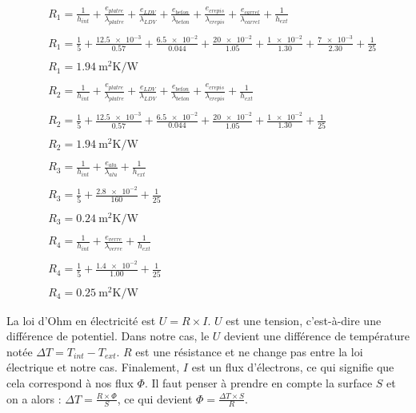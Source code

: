 \documentclass[12pt, a4paper]{article}
\newcommand{\TInt}{\ensuremath{T_{int}}}
\newcommand{\TExt}{\ensuremath{T_{ext}}}
\newcommand{\hInt}{\ensuremath{h_{int}}}
\newcommand{\hExt}{\ensuremath{h_{ext}}}
\newcommand{\RUn}{\ensuremath{R_{1}}}
\newcommand{\RDeux}{\ensuremath{R_{2}}}
\newcommand{\RTrois}{\ensuremath{R_{3}}}
\newcommand{\RQuatre}{\ensuremath{R_{4}}}
\newcommand{\lambdaAlu}{\ensuremath{\lambda_{alu}}}
\newcommand{\lambdaVerre}{\ensuremath{\lambda_{verre}}}
\newcommand{\lambdaPlatre}{\ensuremath{\lambda_{platre}}}
\newcommand{\lambdaLDV}{\ensuremath{\lambda_{LDV}}}
\newcommand{\lambdaBeton}{\ensuremath{\lambda_{beton}}}
\newcommand{\lambdaCrepis}{\ensuremath{\lambda_{crepis}}}
\newcommand{\lambdaCarrel}{\ensuremath{\lambda_{carrel}}}
\newcommand{\ePlatre}{\ensuremath{e_{platre}}}
\newcommand{\eLDV}{\ensuremath{e_{LDV}}}
\newcommand{\eBeton}{\ensuremath{e_{beton}}}
\newcommand{\eCrepis}{\ensuremath{e_{crepis}}}
\newcommand{\eCarrel}{\ensuremath{e_{carrel}}}
\newcommand{\eAlu}{\ensuremath{e_{alu}}}
\newcommand{\eVerre}{\ensuremath{e_{verre}}}
\newcommand{\deltaT}{\ensuremath{\Delta T}}
\begin{document}
\begin{align*}
 & \RUn  = \frac{1}{\hInt} + \frac{\ePlatre}{\lambdaPlatre} + \frac{\eLDV}{\lambdaLDV} + \frac{\eBeton}{\lambdaBeton} + \frac{\eCrepis}{\lambdaCrepis} + \frac{\eCarrel}{\lambdaCarrel} + \frac{1}{\hExt} \\ \\
 & \RUn = \frac{1}{5} + \frac{\num{12.5e-3}}{0.57} + \frac{\num{6.5e-2}}{0.044} + \frac{\num{20e-2}}{1.05} + \frac{\num{1e-2}}{1.30} + \frac{\num{7e-3}}{2.30} + \frac{1}{25} \\ \\
 & \boxed{\RUn = \SI{1.94}{\meter\squared\kelvin\per\watt}} \\ \\
 & \RDeux  = \frac{1}{\hInt} + \frac{\ePlatre}{\lambdaPlatre} + \frac{\eLDV}{\lambdaLDV} + \frac{\eBeton}{\lambdaBeton} + \frac{\eCrepis}{\lambdaCrepis} + \frac{1}{\hExt} \\ \\
 & \RDeux = \frac{1}{5} + \frac{\num{12.5e-3}}{0.57} + \frac{\num{6.5e-2}}{0.044} + \frac{\num{20e-2}}{1.05} + \frac{\num{1e-2}}{1.30} + \frac{1}{25} \\ \\
 & \boxed{\RDeux = \SI{1.94}{\meter\squared\kelvin\per\watt}} \\ \\
 & \RTrois  = \frac{1}{\hInt} + \frac{\eAlu}{\lambdaAlu} + \frac{1}{\hExt} \\ \\
 & \RTrois = \frac{1}{5} + \frac{\num{2.8e-2}}{160} + \frac{1}{25} \\ \\
 & \boxed{\RTrois = \SI{0.24}{\meter\squared\kelvin\per\watt}} \\ \\
 & \RQuatre  = \frac{1}{\hInt} + \frac{\eVerre}{\lambdaVerre} + \frac{1}{\hExt} \\ \\
 & \RQuatre = \frac{1}{5} + \frac{\num{1.4e-2}}{1.00} + \frac{1}{25} \\ \\
 & \boxed{\RQuatre = \SI{0.25}{\meter\squared\kelvin\per\watt}}
\end{align*}

\bigskip

La loi d'Ohm en électricité est $U = R \times I$. $U$ est une tension, c'est-à-dire une différence de potentiel. Dans notre cas, le $U$ devient une différence de température notée $\deltaT = \TInt - \TExt$. $R$ est une résistance et ne change pas entre la loi électrique et notre cas. Finalement, $I$ est un flux d'électrons, ce qui signifie que cela correspond à nos flux $\Phi$. Il faut penser à prendre en compte la surface $S$ et on a alors : $\deltaT = \frac{R \times \Phi}{S}$, ce qui devient $\Phi = \frac{\deltaT \times S}{R}$.
\end{document}
